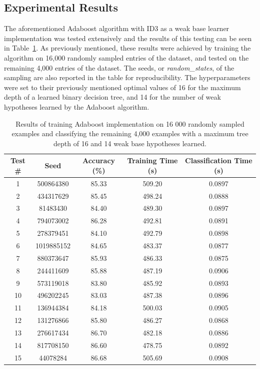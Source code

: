 \documentclass[a4paper]{article}
\begin{document}
\subsection{Experimental Results}
The aforementioned Adaboost algorithm with ID3 as a weak base learner implementation was tested extensively and the results of this testing can be seen in Table~\ref{tbl:adaboost-results}. As previously mentioned, these results were achieved by training the algorithm on 16,000 randomly sampled entries of the dataset, and tested on the remaining 4,000 entries of the dataset. The seeds, or \textit{random\_states}, of the sampling are also reported in the table for reproducibility. The hyperparameters were set to their previously mentioned optimal values of 16 for the maximum depth of a learned binary decision tree, and 14 for the number of weak hypotheses learned by the Adaboost algorithm.

\begin{table}[h!]
    \centering
    \begin{tabular}{||c c c c c||} 
        \hline
        Test \# & Seed & Accuracy (\%)  & Training Time (s) & Classification Time (s) \\ [0.5ex] 
        \hline\hline
        1 & 500864380 & 85.33 & 509.20 & 0.0897 \\
        \hline
        2 & 434317629 & 85.45 & 498.24 & 0.0888 \\
        \hline
        3 & 81483430 & 84.40 & 489.30 & 0.0897 \\
        \hline
        4 & 794073002 & 86.28 & 492.81 & 0.0891 \\
        \hline
        5 & 278379451 & 84.10 & 492.79 & 0.0898 \\
        \hline
        6 & 1019885152 & 84.65 & 483.37 & 0.0877 \\
        \hline
        7 & 880373647 & 85.93 & 486.33 & 0.0875 \\
        \hline
        8 & 244411609 & 85.88 & 487.19 & 0.0906 \\
        \hline
        9 & 573119018 & 83.80 & 485.92 & 0.0893 \\ 
        \hline
        10 & 496202245 & 83.03 & 487.38 & 0.0896 \\
        \hline
        11 & 136944384 & 84.18 & 500.03 & 0.0905 \\
        \hline
        12 & 131276866 & 85.80 & 486.27 & 0.0868 \\
        \hline
        13 & 276617434 & 86.70 & 482.18 & 0.0886 \\
        \hline
        14 & 817708150 & 86.60 & 478.75 & 0.0892 \\
        \hline
        15 & 44078284 & 86.68 & 505.69 & 0.0908 \\ [1ex]
        \hline
    \end{tabular}
    \caption{Results of training Adaboost implementation on 16 000 randomly sampled examples and classifying the remaining 4,000 examples with a maximum tree depth of 16 and 14 weak base hypotheses learned.}
    \label{tbl:adaboost-results}
\end{table}
\end{document}
